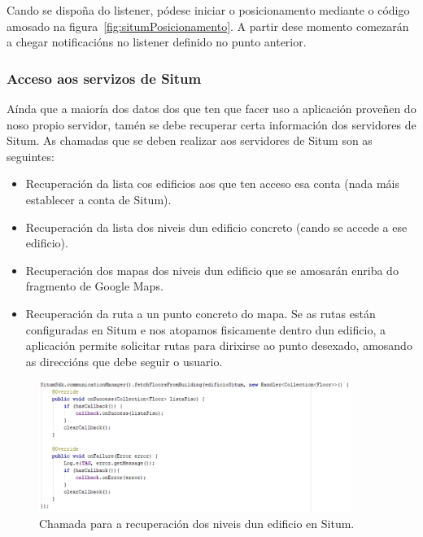 Cando se dispoña do listener, pódese iniciar o posicionamento mediante o código amosado na figura~\ref{fig:situmPosicionamento}. A partir dese momento comezarán a chegar notificacións no listener definido no punto anterior.

\subsubsection{Acceso aos servizos de Situm}
Aínda que a maioría dos datos dos que ten que facer uso a aplicación proveñen do noso propio servidor, tamén se debe recuperar certa información dos servidores de Situm. As chamadas que se deben realizar aos servidores de Situm son as seguintes:

\begin{itemize}
	\item Recuperación da lista cos edificios aos que ten acceso esa conta (nada máis establecer a conta de Situm).
	\item Recuperación da lista dos niveis dun edificio concreto (cando se accede a ese edificio).
	\item Recuperación dos mapas dos niveis dun edificio que se amosarán enriba do fragmento de Google Maps.
	\item Recuperación da ruta a un punto concreto do mapa. Se as rutas están configuradas en Situm e nos atopamos fisicamente dentro dun edificio, a aplicación permite solicitar rutas para dirixirse ao punto desexado, amosando as direccións que debe seguir o usuario.
\end{itemize}

\begin{figure}[htb] 
	\begin{center}
		\includegraphics[width=0.9\textwidth]{figures/codigo/situmExemploChamada}
		\caption{Chamada para a recuperación dos niveis dun edificio en Situm.}
		\label{fig:situmExemploChamada}
	\end{center}
\end{figure}


